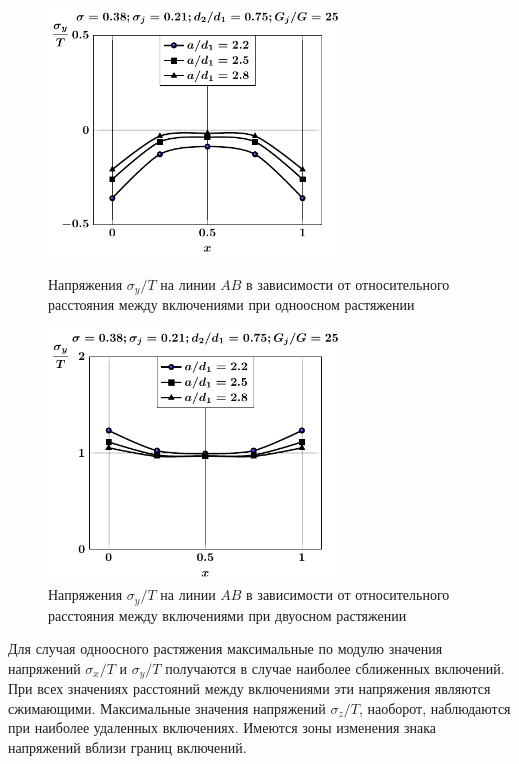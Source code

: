 \begin{figure}[h!]
\centering\footnotesize
\parbox[b]{7.5cm}{\centering\includegraphics[width=7.8cm]{inc4-a-d75-g25-t1-sig_y.pdf}
\caption{Напряжения $\sigma_y/T$ на линии $AB$ в зависимости от относительного расстояния между включениями при одноосном растяжении
\label{f:9:62}}}\hfil\hfil
\parbox[b]{7.5cm}{\centering\includegraphics[width=7.8cm]{inc4-a-d75-g25-t2-sig_y.pdf}
\caption{Напряжения $\sigma_y/T$ на линии $AB$ в зависимости от относительного расстояния между включениями при двуосном растяжении
\label{f:9:63}}}
\end{figure}

Для случая одноосного растяжения максимальные по модулю значения напряжений $\sigma_x/T$ и $\sigma_y/T$ получаются в случае наиболее сближенных включений. При всех значениях расстояний между включениями эти напряжения являются сжимающими. Максимальные значения напряжений $\sigma_z/T$, наоборот, наблюдаются при наиболее удаленных включениях. Имеются зоны изменения знака напряжений вблизи границ включений.

